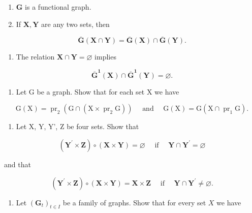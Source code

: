 \begin{enumerate}
\def\labelenumi{(\alph{enumi})}
\item
  \(\mathbf{G}\) is a functional graph.
\item
  If \(\mathbf{X},\mathbf{Y}\) are any two sets, then
\end{enumerate}

\[
\overline {{{\mathbf {G}}}} (\mathbf {X} \cap \mathbf {Y}) = \overline {{{\mathbf {G}}}} (\mathbf {X}) \cap \overline {{{\mathbf {G}}}} (\mathbf {Y}).
\]

\begin{enumerate}
\def\labelenumi{(\alph{enumi})}
\setcounter{enumi}{2}
\tightlist
\item
  The relation \(\mathbf{X} \cap \mathbf{Y} = \varnothing\) implies
\end{enumerate}

\[
\overline {{\mathbf {G}}} ^ {\mathbf {1}} (\mathbf {X}) \cap \overline {{\mathbf {G}}} ^ {\mathbf {1}} (\mathbf {Y}) = \varnothing .
\]

\begin{enumerate}
\def\labelenumi{\arabic{enumi}.}
\setcounter{enumi}{1}
\tightlist
\item
  Let G be a graph. Show that for each set X we have
\end{enumerate}

\[
\mathrm{G} (\mathrm{X}) = \operatorname{pr} _ {2} (\mathrm{G} \cap (\mathrm{X} \times \operatorname{pr} _ {2} \mathrm{G})) \quad \text { and } \quad \mathrm{G} (\mathrm{X}) = \mathrm{G} (\mathrm{X} \cap \operatorname{pr} _ {1} \mathrm{G}).
\]

\begin{enumerate}
\def\labelenumi{\arabic{enumi}.}
\setcounter{enumi}{2}
\tightlist
\item
  Let X, Y, Y', Z be four sets. Show that
\end{enumerate}

\[
(\mathbf {Y} ^ {\prime} \times \mathbf {Z}) \circ (\mathbf {X} \times \mathbf {Y}) = \varnothing \quad \text { if } \quad \mathbf {Y} \cap \mathbf {Y} ^ {\prime} = \varnothing
\]

and that

\[
(\mathbf {Y} ^ {\prime} \times \mathbf {Z}) \circ (\mathbf {X} \times \mathbf {Y}) = \mathbf {X} \times \mathbf {Z} \quad \text { if } \quad \mathbf {Y} \cap \mathbf {Y} ^ {\prime} \neq \varnothing .
\]

\begin{enumerate}
\def\labelenumi{\arabic{enumi}.}
\setcounter{enumi}{3}
\tightlist
\item
  Let \((\mathbf{G}_t)_{t\in I}\) be a family of graphs. Show that for every set \(X\) we have
\end{enumerate}

